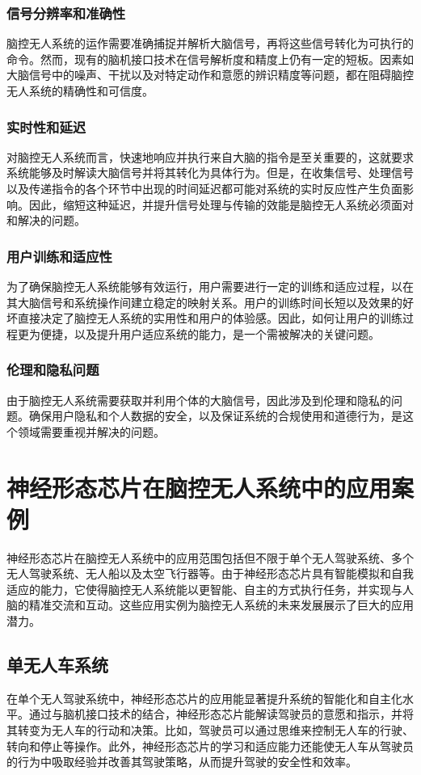 \documentclass{thuemp}
\begin{document}
\subsubsection{信号分辨率和准确性}
脑控无人系统的运作需要准确捕捉并解析大脑信号，再将这些信号转化为可执行的命令。然而，现有的脑机接口技术在信号解析度和精度上仍有一定的短板。因素如大脑信号中的噪声、干扰以及对特定动作和意愿的辨识精度等问题，都在阻碍脑控无人系统的精确性和可信度。

\subsubsection{实时性和延迟}
对脑控无人系统而言，快速地响应并执行来自大脑的指令是至关重要的，这就要求系统能够及时解读大脑信号并将其转化为具体行为。但是，在收集信号、处理信号以及传递指令的各个环节中出现的时间延迟都可能对系统的实时反应性产生负面影响。因此，缩短这种延迟，并提升信号处理与传输的效能是脑控无人系统必须面对和解决的问题。

\subsubsection{用户训练和适应性}
为了确保脑控无人系统能够有效运行，用户需要进行一定的训练和适应过程，以在其大脑信号和系统操作间建立稳定的映射关系。用户的训练时间长短以及效果的好坏直接决定了脑控无人系统的实用性和用户的体验感。因此，如何让用户的训练过程更为便捷，以及提升用户适应系统的能力，是一个需被解决的关键问题。

\subsubsection{伦理和隐私问题}
由于脑控无人系统需要获取并利用个体的大脑信号，因此涉及到伦理和隐私的问题。确保用户隐私和个人数据的安全，以及保证系统的合规使用和道德行为，是这个领域需要重视并解决的问题。

\section{神经形态芯片在脑控无人系统中的应用案例}
神经形态芯片在脑控无人系统中的应用范围包括但不限于单个无人驾驶系统、多个无人驾驶系统、无人船以及太空飞行器等。由于神经形态芯片具有智能模拟和自我适应的能力，它使得脑控无人系统能以更智能、自主的方式执行任务，并实现与人脑的精准交流和互动。这些应用实例为脑控无人系统的未来发展展示了巨大的应用潜力。

\subsection{单无人车系统}
在单个无人驾驶系统中，神经形态芯片的应用能显著提升系统的智能化和自主化水平。通过与脑机接口技术的结合，神经形态芯片能解读驾驶员的意愿和指示，并将其转变为无人车的行动和决策。比如，驾驶员可以通过思维来控制无人车的行驶、转向和停止等操作。此外，神经形态芯片的学习和适应能力还能使无人车从驾驶员的行为中吸取经验并改善其驾驶策略，从而提升驾驶的安全性和效率。
\end{document}
